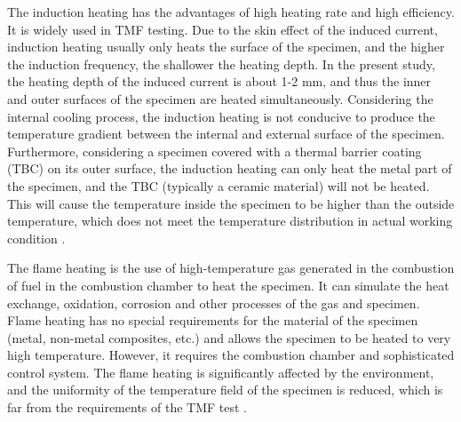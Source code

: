 \documentclass[preprint,5p,twocolumn,11pt,sort&compress]{elsarticle}
\begin{document}

The induction heating has the advantages of high heating rate and high efficiency. It is widely used in TMF testing.
Due to the skin effect of the induced current, induction heating usually only heats the surface of the specimen, and the higher the induction frequency, the shallower the heating depth.
In the present study, the heating depth of the induced current is about 1-2 mm, and thus the inner and outer surfaces of the specimen are heated simultaneously.
Considering the internal cooling process, the induction heating is not conducive to produce the temperature gradient between the internal and external surface of the specimen. Furthermore, considering a specimen covered with a thermal barrier coating (TBC) on its outer surface, the induction heating can only heat the metal part of the specimen, and the TBC (typically a ceramic material) will not be heated. This will cause the temperature inside the specimen to be higher than the outside temperature, which does not meet the temperature distribution in actual working condition \cite{BRENDEL2008234}.

The flame heating is the use of high-temperature gas generated in the combustion of fuel in the combustion chamber to heat the specimen. It can simulate the heat exchange, oxidation, corrosion and other processes of the gas and specimen. Flame heating has no special requirements for the material of the specimen (metal, non-metal composites, etc.) and allows the specimen to be heated to very high temperature. However, it requires the combustion chamber and sophisticated control system. The flame heating is significantly affected by the environment, and the uniformity of the temperature field of the specimen is reduced, which is far from the requirements of the TMF test \cite{MAUGET2017225}.
\end{document}
